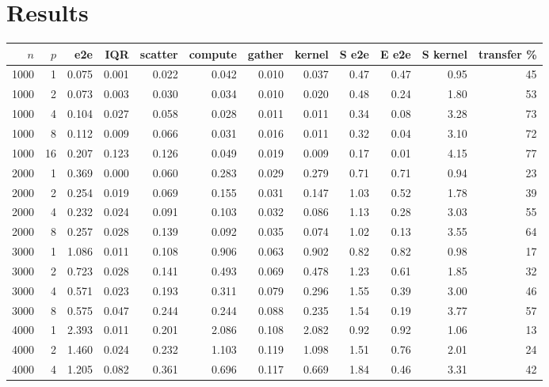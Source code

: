 \documentclass[10pt,a4paper]{article}
\begin{document}
\section{Results}
\begin{center}
\scriptsize
\begin{tabular}{rrrrrrrrrrrr}
\toprule
$n$ & $p$ & e2e & IQR & scatter & compute & gather & kernel & S e2e & E e2e & S kernel & transfer \% \\
\midrule
1000 & 1 & 0.075 & 0.001 & 0.022 & 0.042 & 0.010 & 0.037 & 0.47 & 0.47 & 0.95 & 45 \\
1000 & 2 & 0.073 & 0.003 & 0.030 & 0.034 & 0.010 & 0.020 & 0.48 & 0.24 & 1.80 & 53 \\
1000 & 4 & 0.104 & 0.027 & 0.058 & 0.028 & 0.011 & 0.011 & 0.34 & 0.08 & 3.28 & 73 \\
1000 & 8 & 0.112 & 0.009 & 0.066 & 0.031 & 0.016 & 0.011 & 0.32 & 0.04 & 3.10 & 72 \\
1000 & 16 & 0.207 & 0.123 & 0.126 & 0.049 & 0.019 & 0.009 & 0.17 & 0.01 & 4.15 & 77 \\
2000 & 1 & 0.369 & 0.000 & 0.060 & 0.283 & 0.029 & 0.279 & 0.71 & 0.71 & 0.94 & 23 \\
2000 & 2 & 0.254 & 0.019 & 0.069 & 0.155 & 0.031 & 0.147 & 1.03 & 0.52 & 1.78 & 39 \\
2000 & 4 & 0.232 & 0.024 & 0.091 & 0.103 & 0.032 & 0.086 & 1.13 & 0.28 & 3.03 & 55 \\
2000 & 8 & 0.257 & 0.028 & 0.139 & 0.092 & 0.035 & 0.074 & 1.02 & 0.13 & 3.55 & 64 \\
3000 & 1 & 1.086 & 0.011 & 0.108 & 0.906 & 0.063 & 0.902 & 0.82 & 0.82 & 0.98 & 17 \\
3000 & 2 & 0.723 & 0.028 & 0.141 & 0.493 & 0.069 & 0.478 & 1.23 & 0.61 & 1.85 & 32 \\
3000 & 4 & 0.571 & 0.023 & 0.193 & 0.311 & 0.079 & 0.296 & 1.55 & 0.39 & 3.00 & 46 \\
3000 & 8 & 0.575 & 0.047 & 0.244 & 0.244 & 0.088 & 0.235 & 1.54 & 0.19 & 3.77 & 57 \\
4000 & 1 & 2.393 & 0.011 & 0.201 & 2.086 & 0.108 & 2.082 & 0.92 & 0.92 & 1.06 & 13 \\
4000 & 2 & 1.460 & 0.024 & 0.232 & 1.103 & 0.119 & 1.098 & 1.51 & 0.76 & 2.01 & 24 \\
4000 & 4 & 1.205 & 0.082 & 0.361 & 0.696 & 0.117 & 0.669 & 1.84 & 0.46 & 3.31 & 42 \\
\bottomrule
\end{tabular}
\end{center}
\label{tab:dist}
\end{document}

